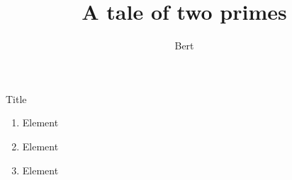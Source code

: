 \documentclass{beamer}
\author{Bert}
\title{A tale of two primes}
\begin{document}
\begin{frame}{Title}
\begin{enumerate}
\item Element
\pause
\item Element
\pause
\item Element
\end{enumerate}
\end{frame}
\end{document}
